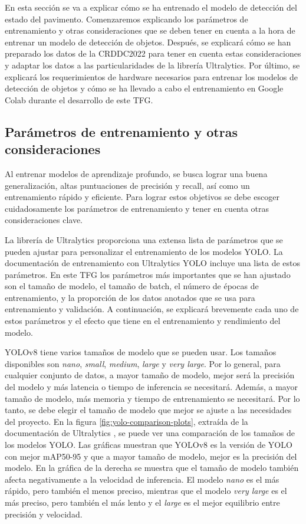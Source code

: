En esta sección se va a explicar cómo se ha entrenado el modelo de detección del estado del pavimento. Comenzaremos explicando los parámetros de entrenamiento y otras consideraciones que se deben tener en cuenta a la hora de entrenar un modelo de detección de objetos. Después, se explicará cómo se han preparado los datos de la CRDDC2022 para tener en cuenta estas consideraciones y adaptar los datos a las particularidades de la librería Ultralytics. Por último, se explicará los requerimientos de hardware necesarios para entrenar los modelos de detección de objetos y cómo se ha llevado a cabo el entrenamiento en Google Colab durante el desarrollo de este TFG.

\subsection{Parámetros de entrenamiento y otras consideraciones}
Al entrenar modelos de aprendizaje profundo, se busca lograr una buena generalización, altas puntuaciones de precisión y recall, así como un entrenamiento rápido y eficiente. Para lograr estos objetivos se debe escoger cuidadosamente los parámetros de entrenamiento y tener en cuenta otras consideraciones clave.

La librería de Ultralytics proporciona una extensa lista de parámetros que se pueden ajustar para personalizar el entrenamiento de los modelos YOLO. La documentación de entrenamiento con Ultralytics YOLO \cite{ultralytics_train} incluye una lista de estos parámetros. En este TFG los parámetros más importantes que se han ajustado son el tamaño de modelo, el tamaño de batch, el número de épocas de entrenamiento, y la proporción de los datos anotados que se usa para entrenamiento y validación. A continuación, se explicará brevemente cada uno de estos parámetros y el efecto que tiene en el entrenamiento y rendimiento del modelo.

YOLOv8 tiene varios tamaños de modelo que se pueden usar. Los tamaños disponibles son \textit{nano}, \textit{small}, \textit{medium}, \textit{large} y \textit{very large}. Por lo general, para cualquier conjunto de datos, a mayor tamaño de modelo, mejor será la precisión del modelo y más latencia o tiempo de inferencia se necesitará. Además, a mayor tamaño de modelo, más memoria y tiempo de entrenamiento se necesitará. Por lo tanto, se debe elegir el tamaño de modelo que mejor se ajuste a las necesidades del proyecto. En la figura \ref{fig:yolo-comparison-plots}, extraída de la documentación de Ultralytics \cite{yolov8_ultralytics}, se puede ver una comparación de los tamaños de los modelos YOLO. Las gráficas muestran que YOLOv8 es la versión de YOLO con mejor mAP50-95 y que a mayor tamaño de modelo, mejor es la precisión del modelo. En la gráfica de la derecha se muestra que el tamaño de modelo también afecta negativamente a la velocidad de inferencia. El modelo \textit{nano} es el más rápido, pero también el menos preciso, mientras que el modelo \textit{very large} es el más preciso, pero también el más lento y el \textit{large} es el mejor equilibrio entre precisión y velocidad.

